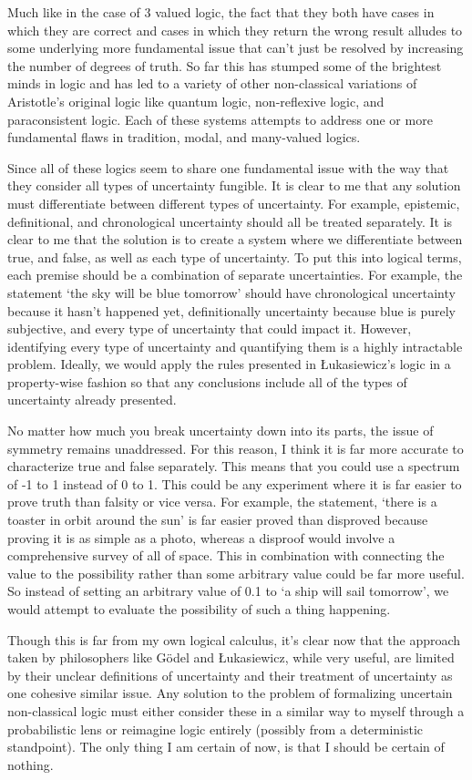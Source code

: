 \documentclass{article}
\begin{document}
Much like in the case of 3 valued logic, the fact that they both have cases in which they are correct and cases in which they return the wrong result alludes to some underlying more fundamental issue that can’t just be resolved by increasing the number of degrees of truth. So far this has stumped some of the brightest minds in logic and has led to a variety of other non-classical variations of Aristotle’s original logic like quantum logic, non-reflexive logic, and paraconsistent logic. Each of these systems attempts to address one or more fundamental flaws in tradition, modal, and many-valued logics.

Since all of these logics seem to share one fundamental issue with the way that they consider all types of uncertainty fungible. It is clear to me that any solution must differentiate between different types of uncertainty. For example, epistemic, definitional, and chronological uncertainty should all be treated separately. It is clear to me that the solution is to create a system where we differentiate between true, and false, as well as each type of uncertainty. To put this into logical terms, each premise should be a combination of separate uncertainties. For example, the statement ‘the sky will be blue tomorrow’ should have chronological uncertainty because it hasn’t happened yet, definitionally uncertainty because blue is purely subjective, and every type of uncertainty that could impact it. However, identifying every type of uncertainty and quantifying them is a highly intractable problem. Ideally, we would apply the rules presented in Łukasiewicz’s logic in a property-wise fashion so that any conclusions include all of the types of uncertainty already presented.

No matter how much you break uncertainty down into its parts, the issue of symmetry remains unaddressed. For this reason, I think it is far more accurate to characterize true and false separately. This means that you could use a spectrum of -1 to 1 instead of 0 to 1. This could be any experiment where it is far easier to prove truth than falsity or vice versa. For example, the statement, ‘there is a toaster in orbit around the sun' is far easier proved than disproved because proving it is as simple as a photo, whereas a disproof would involve a comprehensive survey of all of space. This in combination with connecting the value to the possibility rather than some arbitrary value could be far more useful. So instead of setting an arbitrary value of 0.1 to ‘a ship will sail tomorrow’, we would attempt to evaluate the possibility of such a thing happening.

Though this is far from my own logical calculus, it’s clear now that the approach taken by philosophers like Gödel and Łukasiewicz, while very useful, are limited by their unclear definitions of uncertainty and their treatment of uncertainty as one cohesive similar issue. Any solution to the problem of formalizing uncertain non-classical logic must either consider these in a similar way to myself through a probabilistic lens or reimagine logic entirely (possibly from a deterministic standpoint). The only thing I am certain of now, is that I should be certain of nothing.



\end{document}
